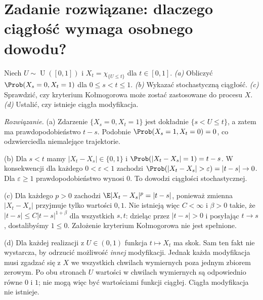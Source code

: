 \section{Zadanie rozwiązane: dlaczego ciągłość wymaga osobnego dowodu?}
\begin{zadanie}
Niech $U\sim\operatorname{U}([0,1])$ i
$X_t=\chi_{\{U\le t\}}$ dla $t\in[0,1]$.
\emph{(a)} Obliczyć $\Prob(X_s=0,X_t=1)$ dla $0\le s<t\le1$.
\emph{(b)} Wykazać stochastyczną ciągłość.
\emph{(c)} Sprawdzić, czy kryterium Kołmogorowa może
zostać zastosowane do procesu $X$.
\emph{(d)} Ustalić, czy istnieje ciągła modyfikacja.

\emph{Rozwiązanie.}
(a) Zdarzenie $\{X_s=0,X_t=1\}$ jest dokładnie
$\{s<U\le t\}$, a zatem ma prawdopodobieństwo $t-s$.
Podobnie $\Prob(X_s=1,X_t=0)=0$, co odzwierciedla
niemalejące trajektorie.

(b) Dla $s<t$ mamy $|X_t-X_s|\in\{0,1\}$ i
$\Prob(|X_t-X_s|=1)=t-s$. W konsekwencji dla każdego
$0<\varepsilon<1$ zachodzi
$\Prob(|X_t-X_s|>\varepsilon)=|t-s|\to0$.
Dla $\varepsilon\ge1$ prawdopodobieństwo wynosi $0$.
To dowodzi ciągłości stochastycznej.

(c) Dla każdego $p>0$ zachodzi
$\E|X_t-X_s|^p=|t-s|$, ponieważ zmienna
$|X_t-X_s|$ przyjmuje tylko wartości $0,1$.
Nie istnieją więc $C<\infty$ i $\beta>0$ takie, że
$|t-s|\le C|t-s|^{1+\beta}$ dla wszystkich $s,t$:
dzieląc przez $|t-s|>0$ i posyłając $t\to s$,
dostalibyśmy $1\le0$. Założenie kryterium
Kołmogorowa nie jest spełnione.

(d) Dla każdej realizacji z $U\in(0,1)$ funkcja
$t\mapsto X_t$ ma skok. Sam ten fakt nie wystarcza,
by odrzucić możliwość \emph{innej} modyfikacji.
Jednak każda modyfikacja musi zgadzać się z $X$
we wszystkich chwilach wymiernych poza jednym zbiorem
zerowym. Po obu stronach $U$ wartości w chwilach
wymiernych są odpowiednio równe $0$ i $1$; nie
mogą więc być wartościami funkcji ciągłej.
Ciągła modyfikacja nie istnieje.
\end{zadanie}

